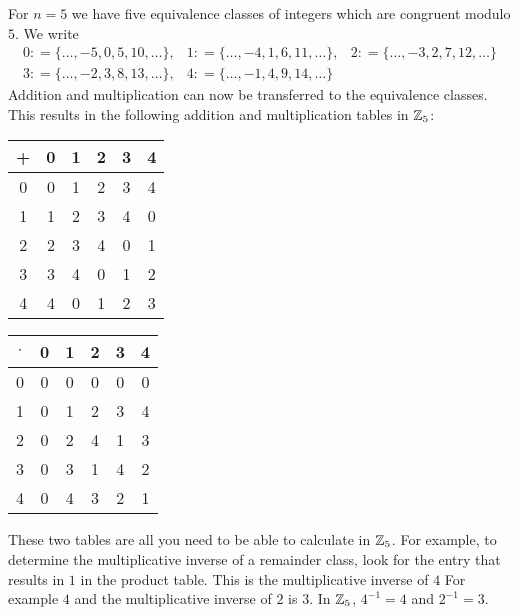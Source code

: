 \begin{example} 
\label{primkoerper_z_5}
For $ n = 5 $ we have five equivalence classes of integers which are congruent modulo $ 5 $. We write
$$
\begin{array}{ccc}
0: = \{\ldots, -5,0,5,10, \ldots \}, &
1: = \{\ldots, -4,1,6,11, \ldots \}, &
2: = \{\ldots, -3,2,7,12, \ldots \} \\
3: = \{\ldots, -2,3,8,13, \ldots \}, &
4: = \{\ldots, -1,4,9,14, \ldots \}
\end{array}
$$
Addition and multiplication can now be transferred to the equivalence classes. This results in the following addition and multiplication tables in $ \mathbb{Z}_5 $:
\begin{center}
  \begin{tabular}{c | c c c c c}
    + & 0 & 1 & 2 & 3 & 4 \\\hline
    0 & 0 & 1 & 2 & 3 & 4 \\
    1 & 1 & 2 & 3 & 4 & 0 \\
    2 & 2 & 3 & 4 & 0 & 1 \\
    3 & 3 & 4 & 0 & 1 & 2 \\
    4 & 4 & 0 & 1 & 2 & 3 \\
  \end{tabular} \quad \quad \quad \quad
  \begin{tabular}{c | c c c c c}
$ \cdot $ & 0 & 1 & 2 & 3 & 4 \\\hline
      0 & 0 & 0 & 0 & 0 & 0 \\
      1 & 0 & 1 & 2 & 3 & 4 \\
      2 & 0 & 2 & 4 & 1 & 3 \\
      3 & 0 & 3 & 1 & 4 & 2 \\
      4 & 0 & 4 & 3 & 2 & 1 \\
  \end{tabular}
\end{center}

These two tables are all you need to be able to calculate in $ \mathbb{Z}_5 $. For example, to determine the multiplicative inverse of a remainder class, look for the entry that results in $ 1 $ in the product table. This is the multiplicative inverse of $ 4 $ For example $ 4 $ and the multiplicative inverse of $ 2 $ is $ 3 $. In $ \mathbb{Z}_5 $, $ 4^{- 1} = 4 $ and $ 2^{- 1} = 3 $.
\end{example}


